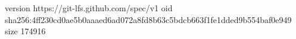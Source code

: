version https://git-lfs.github.com/spec/v1
oid sha256:4ff230cd0ae5b0aaaed6ad072a8fd8b63c5bdcb663f1fe1dded9b554baf0e949
size 174916
